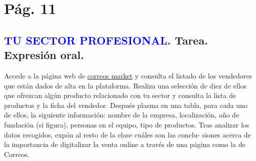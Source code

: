 \documentclass[spanish,openany]{report}
\date{\today}
\begin{document}

\maketoc
%

\section{Pág. 11}
\subsection{\textcolor{blue}{TU SECTOR PROFESIONAL.} Tarea. Expresión oral.}
Accede a la página web de \href{https://bit.ly/491sErk}{correos market} y consulta el listado de los vendedores que están dados de alta en la plataforma. Realiza una selección de diez de ellos que ofrezcan algún producto relacionado con tu sector y consulta la lista de productos y la ficha del vendedor. Después plasma en una tabla, para cada uno de ellos, la siguiente información: nombre de la empresa, localización, año de fundación (si figura), personas en el equipo, tipo de productos. Tras analizar los datos recogidos, expón al resto de la clase cuáles son las conclu- siones acerca de la importancia de digitalizar la venta online a través de una página como la de Correos.
\vspace{2em}
\end{document}
